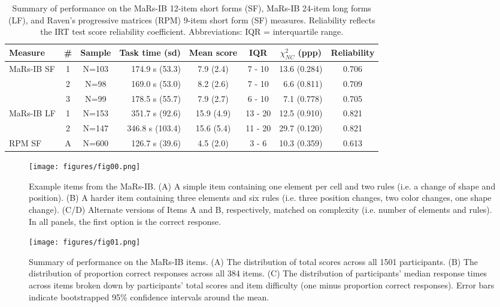 \documentclass[a4paper,man,natbib]{apa6}
\begin{document}
\begin{table}
    \small
    \centering
    \begin{tabular*}{1.07\textwidth}{lccrccrc}
    \toprule
    Measure & \# & Sample & \multicolumn{1}{c}{Task time (sd)} & \multicolumn{1}{c}{Mean score} (sd) & IQR & \multicolumn{1}{c}{$\chi^2_{NC}$ (ppp)} & Reliability \\
    \midrule
    MaRs-IB SF & 1 & N=103 & 174.9 s  (53.3)  &  7.9 (2.4) &  7 - 10 & 13.6 (0.284) & 0.706 \\
               & 2 & N=98  & 169.0 s  (53.0)  &  8.2 (2.6) &  7 - 10 & 6.6 (0.811)  & 0.709 \\
               & 3 & N=99  & 178.5 s  (55.7)  &  7.9 (2.7) &  6 - 10 & 7.1 (0.778)  & 0.705 \\
    \midrule
    MaRs-IB LF & 1 & N=153  & 351.7 s (92.6)  & 15.9 (4.9) & 13 - 20 & 12.5 (0.910) & 0.821 \\
               & 2 & N=147  & 346.8 s (103.4) & 15.6 (5.4) & 11 - 20 & 29.7 (0.120) & 0.821 \\
    \midrule
    RPM SF     & A & N=600  & 126.7 s (39.6)  &  4.5 (2.0) &  3 - 6  & 10.3 (0.359) & 0.613 \\
    \bottomrule
    \end{tabular*}
    \caption{\label{table:3}\normalfont Summary of performance on the MaRs-IB 12-item short forms (SF), MaRs-IB 24-item long forms (LF), and Raven's progressive matrices (RPM) 9-item short form (SF) measures. Reliability reflects the IRT test score reliability coefficient. Abbreviations: IQR = interquartile range.}
\end{table}


\begin{figure}
\centering
\texttt{[image: figures/fig00.png]}
\caption{\label{fig:fig00} Example items from the MaRs-IB. (A) A simple item containing one element per cell and two rules (i.e. a change of shape and position). (B) A harder item containing three elements and six rules (i.e. three position changes, two color changes, one shape change). (C/D) Alternate versions of Items A and B, respectively, matched on complexity (i.e. number of elements and rules). In all panels, the first option is the correct response.}
\end{figure}

\begin{figure}
\centering
\texttt{[image: figures/fig01.png]}
\caption{\label{fig:fig01}Summary of performance on the MaRs-IB items. (A) The distribution of total scores across all 1501 participants. (B) The distribution of proportion correct responses across all 384 items. (C) The distribution of participants' median response times across items broken down by participants' total scores and item difficulty (one minus proportion correct responses). Error bars indicate bootstrapped 95\% confidence intervals around the mean.}
\end{figure}
\end{document}
